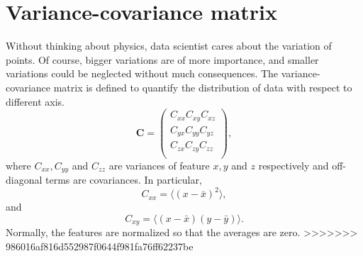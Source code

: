 \section{Variance-covariance matrix}
Without thinking about physics, data scientist cares about the variation of points. Of course, bigger variations are of more importance, and smaller variations could be neglected without much consequences. The variance-covariance matrix is defined to quantify the distribution of data with respect to different axis.
\begin{equation}
	\mathbf{C} = \begin{pmatrix}
			C_{xx} C_{xy} C_{xz}\\
			C_{yx} C_{yy} C_{yz}\\
			C_{zx} C_{zy} C_{zz}\\
		     \end{pmatrix},
\end{equation}
where $C_{xx}, C_{yy}$ and $C_{zz}$ are variances of feature $x, y$ and $z$ respectively and off-diagonal terms are covariances. In particular,
\begin{equation}
C_{xx} = \langle (x-\bar x)^2\rangle,	
\end{equation}
and
\begin{equation}
C_{xy} = \langle(x-\bar x)(y-\bar y)\rangle.
\end{equation}
Normally, the features are normalized so that the averages are zero.
>>>>>>> 986016af816d552987f0644f981fa76ff62237be
